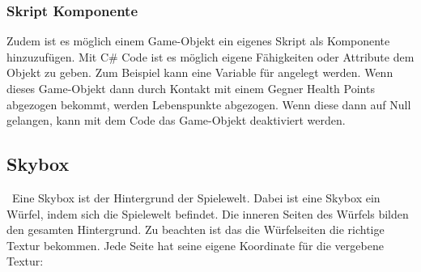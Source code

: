 \pagebreak
{}

\subsubsection{Skript Komponente}
Zudem ist es möglich einem Game-Objekt ein eigenes Skript als Komponente hinzuzufügen. Mit C\# Code ist es möglich eigene Fähigkeiten oder Attribute dem Objekt zu geben. Zum Beispiel kann eine Variable für  angelegt werden. Wenn dieses Game-Objekt dann durch Kontakt mit einem Gegner Health Points abgezogen bekommt, werden Lebenspunkte abgezogen. Wenn diese dann auf Null gelangen, kann mit dem Code das Game-Objekt deaktiviert werden.


\subsection{Skybox}\
Eine Skybox ist der Hintergrund der Spielewelt. Dabei ist eine Skybox ein Würfel, indem sich die Spielewelt befindet. Die inneren Seiten des Würfels bilden den gesamten Hintergrund.
Zu beachten ist das die Würfelseiten die richtige Textur bekommen. Jede Seite hat seine eigene Koordinate für die vergebene Textur:\\\\

